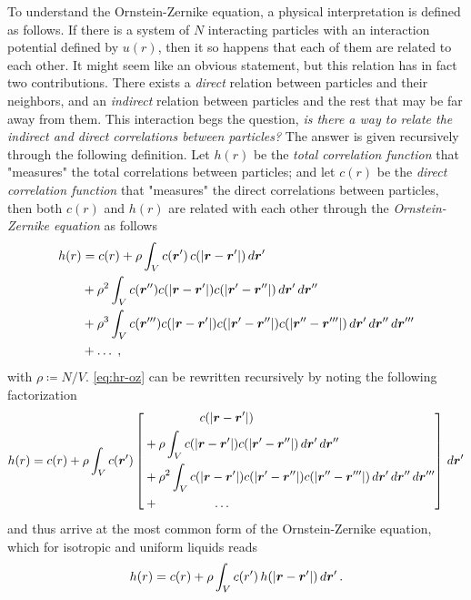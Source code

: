 To understand the Ornstein-Zernike equation, a physical interpretation is defined as
follows. If there is a system of $N$ interacting particles with an interaction potential
defined by $u(r)$, then it so happens that each of them are related to each other.
It might seem like an obvious statement, but this relation has in fact two contributions.
There exists a \emph{direct} relation between particles and
their neighbors, and an \emph{indirect} relation between particles and the rest that
may be far away from them. This interaction begs the question,
\emph{is there a way to relate the indirect and direct correlations between particles?}
The answer is given recursively through the following definition. Let $h(r)$ be the
\emph{total correlation function} that "measures" the total correlations between
particles; and let $c(r)$ be the \emph{direct correlation function} that "measures"
the direct correlations between particles, then both $c(r)$ and $h(r)$ are related
with each other through the \emph{Ornstein-Zernike equation} as follows
\begin{equation}
    \begin{aligned}
        h(r) &= c(r) + \rho \int_{V} c(\bm{r}') \, c(\lvert \bm{r} - \bm{r}' \rvert) \, d \bm{r}' \\
        &+ \rho^2 \int_{V} c(\bm{r}'') c(\lvert \bm{r} - \bm{r}' \rvert) c(\lvert \bm{r}' - \bm{r}'' \rvert) \, d \bm{r}' \, d \bm{r}'' \\
        &+ \rho^3 \int_{V} c(\bm{r}''') c(\lvert \bm{r} - \bm{r}' \rvert) c(\lvert \bm{r}' - \bm{r}'' \rvert) c(\lvert \bm{r}'' - \bm{r}''' \rvert) \, d \bm{r}' \, d \bm{r}''
        \, d \bm{r}''' \\
        &+ \dots \; ,
    \end{aligned}
    \label{eq:hr-oz}
\end{equation}
with \(\rho \coloneqq N / V .\)
\autoref{eq:hr-oz} can be rewritten recursively by noting the following factorization
\begin{equation}
    h(r) = c(r) + \rho \int_{V} c(\bm{r}') \left[
    \begin{aligned}
        & \hspace{1.6cm} c(\lvert \bm{r} - \bm{r}' \rvert) \\
        &+ \rho \int_{V} c(\lvert \bm{r} - \bm{r}' \rvert) c(\lvert \bm{r}' - \bm{r}'' \rvert) \, d \bm{r}' \, d \bm{r}'' \\
        &+ \rho^2 \int_{V} c(\lvert \bm{r} - \bm{r}' \rvert) c(\lvert \bm{r}' - \bm{r}'' \rvert) c(\lvert \bm{r}'' - \bm{r}''' \rvert) \, d \bm{r}' \, d \bm{r}''
        \, d \bm{r}''' \\
        &+ \hspace{1.6cm} \dots
    \end{aligned}
    \right] \, d \bm{r}'
    \label{eq:oz-factorization}
\end{equation}
and thus arrive at the most common form of the Ornstein-Zernike equation, which for
isotropic and uniform liquids reads
\begin{equation}
    h(r) = c(r) + \rho \int_{V} c(r') \, h(\lvert \bm{r} - \bm{r}' \rvert) \, d \bm{r}'
    \, .
    \label{eq:ornstein-zernike}
\end{equation}

